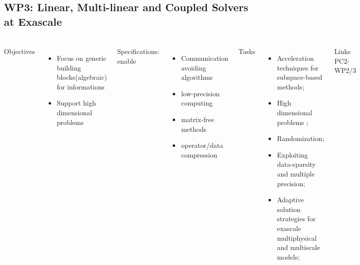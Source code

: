 \subsection{WP3: Linear, Multi-linear and Coupled Solvers at Exascale}
\begin{frame}
  \frametitle{\insertsectionhead}
  \framesubtitle{\insertsubsectionhead}
  \footnotesize
  \begin{columns}[t]
    Objectives
    \begin{itemize}
      \item Focus on generic building blocks(algebraic) for informations
      \item Support high dimensional problems
    \end{itemize}
    Specifications: enable
    \begin{itemize}
      \item Communication avoiding algorithms
      \item low-precision computing
      \item matrix-free methods
      \item operator/data compression
    \end{itemize}
    Tasks
    \begin{itemize}
      \item Acceleration techniques for subspace-based methods;
      \item High dimensional problems ;
      \item Randomization;
      \item Exploiting data-sparsity and multiple precision;
      \item Adaptive solution strategies for exascale multiphysical and multiscale models;
    \end{itemize}
    \begin{alertblock}{Links}
    PC2-WP2/3   
  \end{alertblock}
  \end{columns}
\end{frame}

